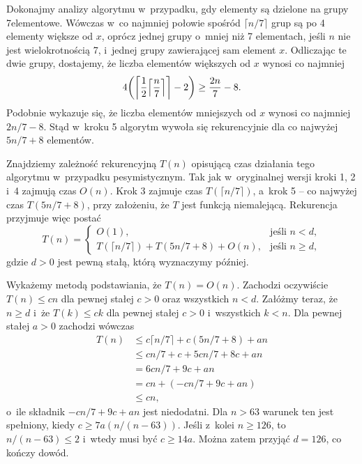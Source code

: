 \bignegskip

\exercise %
Dokonajmy analizy algorytmu  w~przypadku, gdy elementy są dzielone na grupy 7\nbhyphen elementowe.
Wówczas w~co najmniej połowie spośród $\lceil n/7\rceil$ grup są po 4 elementy większe od $x$, oprócz jednej grupy o~mniej niż 7 elementach, jeśli $n$ nie jest wielokrotnością 7, i~jednej grupy zawierającej sam element $x$.
Odliczając te dwie grupy, dostajemy, że liczba elementów większych od $x$ wynosi co najmniej
\[
	4\biggl(\biggl\lceil\frac{1}{2}\Bigl\lceil\frac{n}{7}\Bigr\rceil\biggr\rceil-2\biggr) \ge \frac{2n}{7}-8.
\]
Podobnie wykazuje się, że liczba elementów mniejszych od $x$ wynosi co najmniej $2n/7-8$.
Stąd w~kroku 5 algorytm wywoła się rekurencyjnie dla co najwyżej $5n/7+8$ elementów.

Znajdziemy zależność rekurencyjną $T(n)$ opisującą czas działania tego algorytmu w~przypadku pesymistycznym.
Tak jak w~oryginalnej wersji kroki 1, 2 i~4 zajmują czas $O(n)$.
Krok 3 zajmuje czas $T(\lceil n/7\rceil)$, a~krok 5 -- co najwyżej czas $T(5n/7+8)$, przy założeniu, że $T$ jest funkcją niemalejącą.
Rekurencja przyjmuje więc postać
\[
	T(n) = \begin{cases}
		O(1), & \text{jeśli $n<d$}, \\
		T(\lceil n/7\rceil)+T(5n/7+8)+O(n), & \text{jeśli $n\ge d$},
	\end{cases}
\]
gdzie $d>0$ jest pewną stałą, którą wyznaczymy później.

Wykażemy metodą podstawiania, że $T(n)=O(n)$.
Zachodzi oczywiście $T(n)\le cn$ dla pewnej stałej $c>0$ oraz wszystkich $n<d$.
Załóżmy teraz, że $n\ge d$ i~że $T(k)\le ck$ dla pewnej stałej $c>0$ i~wszystkich $k<n$.
Dla pewnej stałej $a>0$ zachodzi wówczas
\begin{align*}
	T(n) &\le c\lceil n/7\rceil+c(5n/7+8)+an \\
	&\le cn/7+c+5cn/7+8c+an \\
	&= 6cn/7+9c+an \\
	&= cn+(-cn/7+9c+an) \\
	&\le cn,
\end{align*}
o~ile składnik $-cn/7+9c+an$ jest niedodatni.
Dla $n>63$ warunek ten jest spełniony, kiedy $c\ge7a(n/(n-63))$.
Jeśli z~kolei $n\ge126$, to $n/(n-63)\le2$ i~wtedy musi być $c\ge14a$.
Można zatem przyjąć $d=126$, co kończy dowód.

